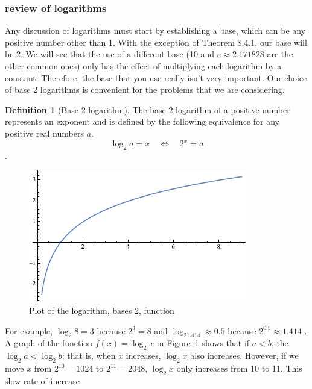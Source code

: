 \documentclass[10pt,]{book}
\theoremstyle{plain}
\theoremstyle{definition}
\newtheorem{definition}[theorem]{Definition}
\theoremstyle{definition}
\theoremstyle{definition}
\theoremstyle{definition}
\numberwithin{equation}{section}
\begin{document}
\subsubsection[review of logarithms]{review of logarithms}\label{sss-review-of-logarithms}
Any discussion of logarithms must start by establishing a base, which can be any positive number other than 1. With the exception of Theorem 8.4.1,
our base will be 2. We will see that the use of a different base (10 and \(e\approx  2.171828\) are the other common ones) only has the effect of
multiplying each logarithm by a constant. Therefore, the base that you use really isn't very important. Our choice of base 2 logarithms is convenient
for the problems that we are considering.%
\begin{definition}[Base 2 logarithm]\label{def-log-base-2}
The base 2 logarithm of a positive number represents an exponent and is defined by the following equivalence for any positive real numbers \(a\).
\[\log_2 a = x \quad \Leftrightarrow \quad 2^x= a\]. %
\end{definition}
\leavevmode%
\begin{figure}
\centering
\includegraphics[width=1\linewidth]{images/fig-log-2-plot.png}
\caption{Plot of the logarithm, bases 2, function\label{fig-log-2-plot}}
\end{figure}
\par
For example, \(\log_2 8 = 3\) because \(2^3 = 8\) and \(\log_21.414\approx 0.5\) because \(2^{0.5}\approx 1.414\) . A graph of the function \(f(x)
= \log_2 x\) in \hyperref[fig-log-2-plot]{Figure~\ref{fig-log-2-plot}} shows that if \(a < b\), the \(\log_2a < \log_2 b\); that is, when \(x\) increases, \(\log_2 x\) also increases.
However, if we move \(x\) from \(2^{10} = 1024\) to \(2^{11} = 2048\), \(\log_2 x\) only increases from 10 to 11. This slow rate of increase
\end{document}
